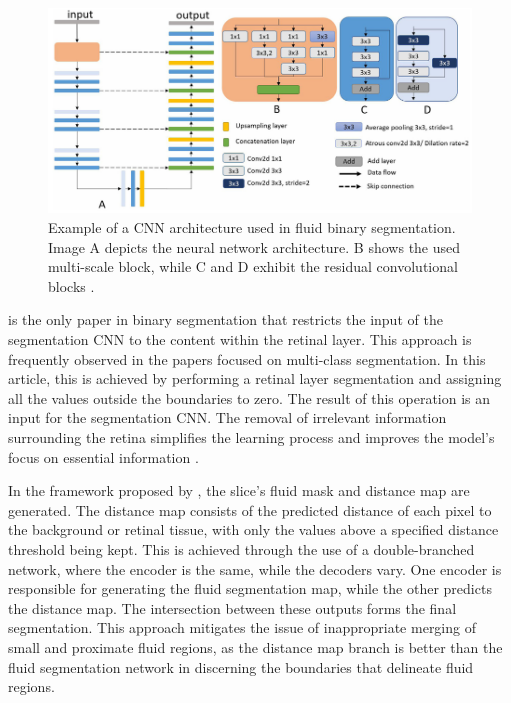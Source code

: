 \begin{figure}[!ht]
	\centering
	\includegraphics[width=1\linewidth]{figures/BinarySegmentationExample.png}
	\caption{Example of a CNN architecture used in fluid binary segmentation. Image A depicts the neural network architecture. B shows the used multi-scale block, while C and D exhibit the residual convolutional blocks \parencite{Guo2020}.}
	\label{fig:BinarySegmentationExample}
\end{figure}
\par
\textcite{Pawan2021} is the only paper in binary segmentation that restricts the input of the segmentation CNN to the content within the retinal layer. This approach is frequently observed in the papers focused on multi-class segmentation. In this article, this is achieved by performing a retinal layer segmentation and assigning all the values outside the boundaries to zero. The result of this operation is an input for the segmentation CNN. The removal of irrelevant information surrounding the retina simplifies the learning process and improves the model's focus on essential information \parencite{Mantel2021}.
\par
In the framework proposed by \textcite{Liu2021}, the  slice's fluid mask and distance map are generated. The distance map consists of the predicted distance of each pixel to the background or retinal tissue, with only the values above a specified distance threshold being kept. This is achieved through the use of a double-branched network, where the encoder is the same, while the decoders vary. One encoder is responsible for generating the fluid segmentation map, while the other predicts the distance map. The intersection between these outputs forms the final segmentation. This approach mitigates the issue of inappropriate merging of small and proximate fluid regions, as the distance map branch is better than the fluid segmentation network in discerning the boundaries that delineate fluid regions.
